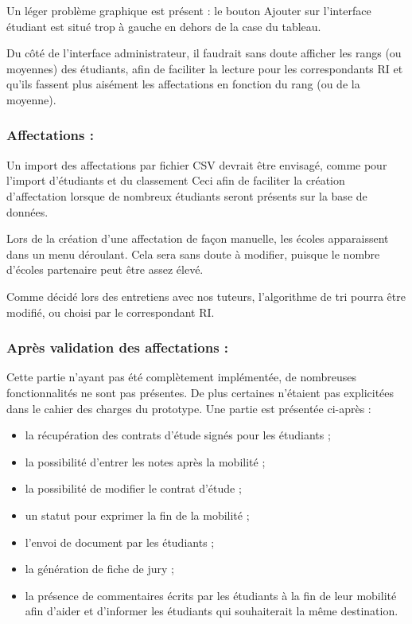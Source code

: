 Un léger problème graphique est présent : le bouton \og Ajouter \fg{} sur l'interface étudiant est situé trop à gauche en dehors de la case du tableau.

Du côté de l'interface administrateur, il faudrait sans doute afficher les rangs (ou moyennes) des étudiants, afin de faciliter la lecture pour les correspondants RI et qu'ils fassent plus aisément les affectations en fonction du rang (ou de la moyenne).


\subsubsection{Affectations :}
Un import des affectations par fichier CSV devrait être envisagé, comme pour l'import d'étudiants et du classement Ceci afin de faciliter la création d'affectation lorsque de nombreux étudiants seront présents sur la base de données.

Lors de la création d'une affectation de façon manuelle, les écoles apparaissent dans un menu déroulant. Cela sera sans doute à modifier, puisque le nombre d'écoles partenaire peut être assez élevé.

Comme décidé lors des entretiens avec nos tuteurs, l'algorithme de tri pourra être modifié, ou choisi par le correspondant RI.


\subsubsection{Après validation des affectations :}
Cette partie n'ayant pas été complètement implémentée, de nombreuses fonctionnalités ne sont pas présentes. De plus certaines n'étaient pas explicitées dans le cahier des charges du prototype. Une partie est présentée ci-après :
\begin{itemize}
\item la récupération des contrats d'étude signés pour les étudiants ;
\item la possibilité d'entrer les notes après la mobilité ;
\item la possibilité de modifier le contrat d'étude ;
\item un statut pour exprimer la fin de la mobilité ;
\item l'envoi de document par les étudiants ;
\item la génération de fiche de jury ;
\item la présence de commentaires écrits par les étudiants à la fin de leur mobilité afin d'aider et d'informer les étudiants qui souhaiterait la même destination.
\end{itemize}


